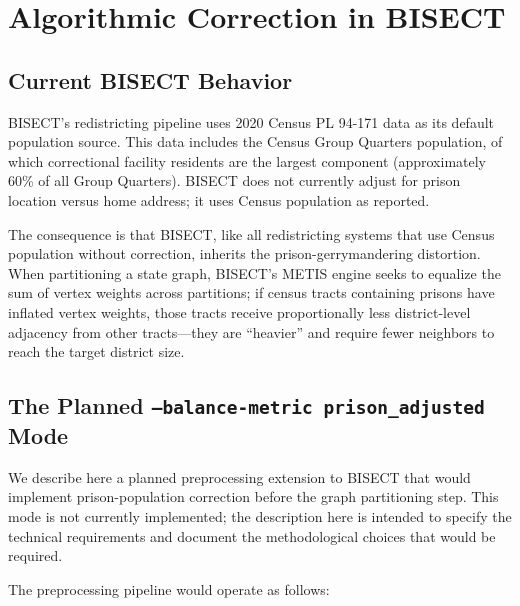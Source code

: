 \section{Algorithmic Correction in BISECT}
\label{sec:algorithmic}

\subsection{Current BISECT Behavior}

BISECT's redistricting pipeline uses 2020 Census PL 94-171 data as its default population source. This data includes the Census Group Quarters population, of which correctional facility residents are the largest component (approximately 60\% of all Group Quarters). BISECT does not currently adjust for prison location versus home address; it uses Census population as reported.

The consequence is that BISECT, like all redistricting systems that use Census population without correction, inherits the prison-gerrymandering distortion. When partitioning a state graph, BISECT's METIS engine seeks to equalize the sum of vertex weights across partitions; if census tracts containing prisons have inflated vertex weights, those tracts receive proportionally less district-level adjacency from other tracts---they are ``heavier'' and require fewer neighbors to reach the target district size.

\subsection{The Planned \texttt{--balance-metric prison\_adjusted} Mode}

We describe here a planned preprocessing extension to BISECT that would implement prison-population correction before the graph partitioning step. This mode is not currently implemented; the description here is intended to specify the technical requirements and document the methodological choices that would be required.

The preprocessing pipeline would operate as follows:

